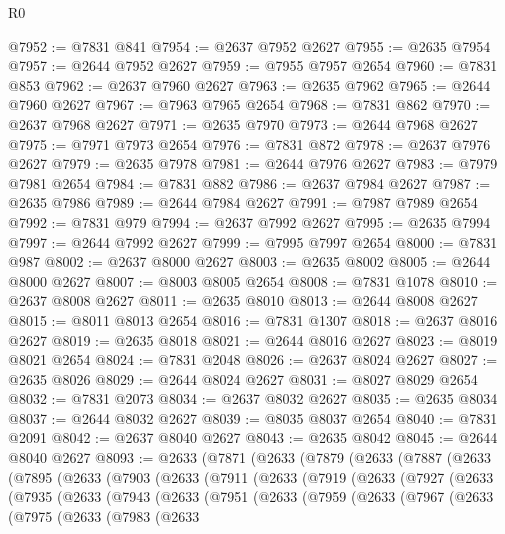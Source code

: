 \begin{lexlean}{R0}
\begin{coremodule}
@7952 := @7831 @841
@7954 := @2637 @7952 @2627
@7955 := @2635 @7954
@7957 := @2644 @7952 @2627
@7959 := @7955 @7957 @2654
@7960 := @7831 @853
@7962 := @2637 @7960 @2627
@7963 := @2635 @7962
@7965 := @2644 @7960 @2627
@7967 := @7963 @7965 @2654
@7968 := @7831 @862
@7970 := @2637 @7968 @2627
@7971 := @2635 @7970
@7973 := @2644 @7968 @2627
@7975 := @7971 @7973 @2654
@7976 := @7831 @872
@7978 := @2637 @7976 @2627
@7979 := @2635 @7978
@7981 := @2644 @7976 @2627
@7983 := @7979 @7981 @2654
@7984 := @7831 @882
@7986 := @2637 @7984 @2627
@7987 := @2635 @7986
@7989 := @2644 @7984 @2627
@7991 := @7987 @7989 @2654
@7992 := @7831 @979
@7994 := @2637 @7992 @2627
@7995 := @2635 @7994
@7997 := @2644 @7992 @2627
@7999 := @7995 @7997 @2654
@8000 := @7831 @987
@8002 := @2637 @8000 @2627
@8003 := @2635 @8002
@8005 := @2644 @8000 @2627
@8007 := @8003 @8005 @2654
@8008 := @7831 @1078
@8010 := @2637 @8008 @2627
@8011 := @2635 @8010
@8013 := @2644 @8008 @2627
@8015 := @8011 @8013 @2654
@8016 := @7831 @1307
@8018 := @2637 @8016 @2627
@8019 := @2635 @8018
@8021 := @2644 @8016 @2627
@8023 := @8019 @8021 @2654
@8024 := @7831 @2048
@8026 := @2637 @8024 @2627
@8027 := @2635 @8026
@8029 := @2644 @8024 @2627
@8031 := @8027 @8029 @2654
@8032 := @7831 @2073
@8034 := @2637 @8032 @2627
@8035 := @2635 @8034
@8037 := @2644 @8032 @2627
@8039 := @8035 @8037 @2654
@8040 := @7831 @2091
@8042 := @2637 @8040 @2627
@8043 := @2635 @8042
@8045 := @2644 @8040 @2627
@8093 := @2633
    (@7871
      (@2633
        (@7879
          (@2633
            (@7887
              (@2633
                (@7895
                  (@2633
                    (@7903
                      (@2633
                        (@7911
                          (@2633
                            (@7919
                              (@2633
                                (@7927
                                  (@2633
                                    (@7935
                                      (@2633
                                        (@7943
                                          (@2633
                                            (@7951
                                              (@2633
                                                (@7959
                                                  (@2633
                                                    (@7967
                                                      (@2633
                                                        (@7975
                                                          (@2633
                                                            (@7983
                                                              (@2633

\end{coremodule}
\end{lexlean}
